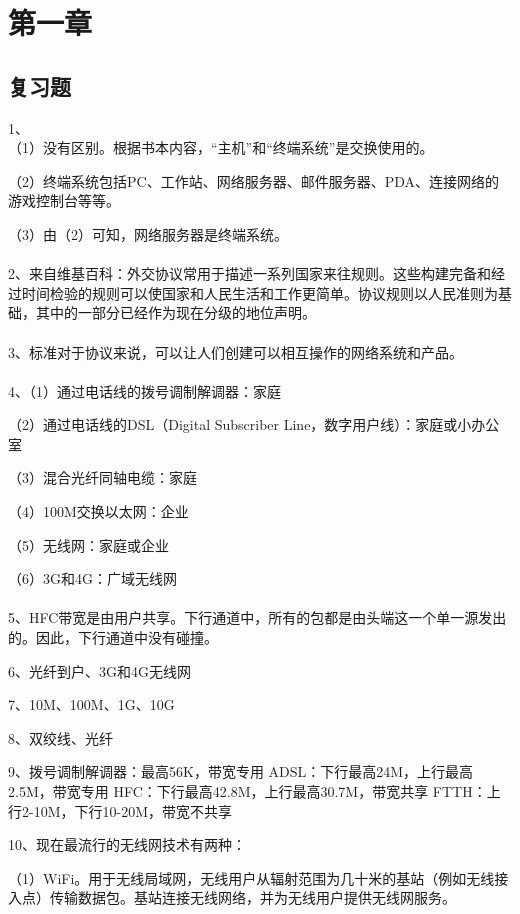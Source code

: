 \documentclass[11pt,UTF8,twoside]{article}
\begin{document}
    \section{第一章}
    \subsection{复习题}
    1、\\
    （1）没有区别。根据书本内容，“主机”和“终端系统”是交换使用的。
    
    （2）终端系统包括PC、工作站、网络服务器、邮件服务器、PDA、连接网络的游戏控制台等等。
    
    （3）由（2）可知，网络服务器是终端系统。
    \\\\
    2、来自维基百科：外交协议常用于描述一系列国家来往规则。这些构建完备和经过时间检验的规则可以使国家和人民生活和工作更简单。协议规则以人民准则为基础，其中的一部分已经作为现在分级的地位声明。
     \\\\
    3、标准对于协议来说，可以让人们创建可以相互操作的网络系统和产品。
     \\\\
    4、（1）通过电话线的拨号调制解调器：家庭
    
    （2）通过电话线的DSL（Digital Subscriber Line，数字用户线）：家庭或小办公室
    
    （3）混合光纤同轴电缆：家庭
    
    （4）100M交换以太网：企业
    
    （5）无线网：家庭或企业
    
    （6）3G和4G：广域无线网
     \\\\
    5、HFC带宽是由用户共享。下行通道中，所有的包都是由头端这一个单一源发出的。因此，下行通道中没有碰撞。
    
    6、光纤到户、3G和4G无线网
    
    7、10M、100M、1G、10G
    
    8、双绞线、光纤
    
    9、拨号调制解调器：最高56K，带宽专用
    ADSL：下行最高24M，上行最高2.5M，带宽专用
    HFC：下行最高42.8M，上行最高30.7M，带宽共享
    FTTH：上行2-10M，下行10-20M，带宽不共享
    
    10、现在最流行的无线网技术有两种：
    
    （1）WiFi。用于无线局域网，无线用户从辐射范围为几十米的基站（例如无线接入点）传输数据包。基站连接无线网络，并为无线用户提供无线网服务。
    
\end{document}
